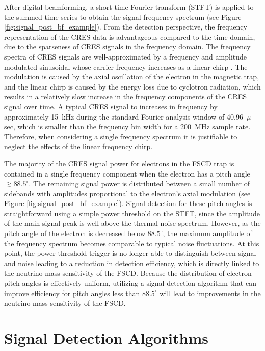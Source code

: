 After digital beamforming, a short-time Fourier transform (STFT) is applied to the summed time-series to obtain the signal frequency spectrum (see Figure \ref{fig:signal_post_bf_example}). From the detection perspective, the frequency representation of the CRES data is advantageous compared to the time domain, due to the sparseness of CRES signals in the frequency domain. The frequency spectra of CRES signals are well-approximated by a frequency and amplitude modulated sinusoidal whose carrier frequency increases as a linear chirp \cite{p8pheno}. The modulation is caused by the axial oscillation of the electron in the magnetic trap, and the linear chirp is caused by the energy loss due to cyclotron radiation, which results in a relatively slow increase in the frequency components of the CRES signal over time. A typical CRES signal to increases in frequency by approximately 15~kHz during the standard Fourier analysis window of 40.96~$\mu$sec, which is smaller than the frequency bin width for a 200~MHz sample rate. Therefore, when considering a single frequency spectrum it is justifiable to neglect the effects of the linear frequency chirp. 

The majority of the CRES signal power for electrons in the FSCD trap is contained in a single frequency component when the electron has a pitch angle $\gtrsim 88.5^\circ$. The remaining signal power is distributed between a small number of sidebands with amplitudes proportional to the electron's axial modulation (see Figure \ref{fig:signal_post_bf_example}). Signal detection for these pitch angles is straightforward using a simple power threshold on the STFT, since the amplitude of the main signal peak is well above the thermal noise spectrum. However, as the pitch angle of the electron is decreased below $88.5^\circ$, the maximum amplitude of the frequency spectrum becomes comparable to typical noise fluctuations. At this point, the power threshold trigger is no longer able to distinguish between signal and noise leading to a reduction in detection efficiency, which is directly linked to the neutrino mass sensitivity of the FSCD. Because the distribution of electron pitch angles is effectively uniform, utilizing a signal detection algorithm that can improve efficiency for pitch angles less than $88.5^\circ$ will lead to improvements in the neutrino mass sensitivity of the FSCD. 

\section{Signal Detection Algorithms}
\label{sec:classifiers}

